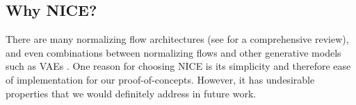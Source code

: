 \documentclass[../main.tex]{subfiles}
\begin{document}
\subsection{Why NICE?}

There are many normalizing flow architectures \cite{dinhNICE2015, kingmaGlow2018, dinhDensity2022} (see \cite{kobyzevNormalizing2021} for a comprehensive review), and even combinations between normalizing flows and other generative models such as VAEs \cite{rezendeVariational2015}.
One reason for choosing NICE is its simplicity and therefore ease of implementation for our proof-of-concepts.
However, it has undesirable properties that we would definitely address in future work.
\end{document}
